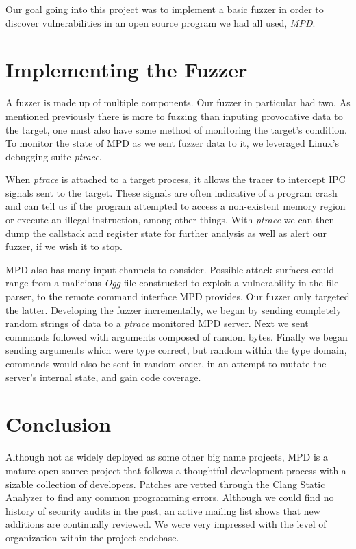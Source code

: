 \documentclass[10pt]{article}
\begin{document}
Our goal going into this project was to implement a basic fuzzer in order to discover vulnerabilities in an open source program we had all used, \emph{MPD}.
\section{Implementing the Fuzzer}
A fuzzer is made up of multiple components. Our fuzzer in particular had two. As mentioned previously there is more to fuzzing than inputing provocative data to the target, one must also have some method of monitoring the target's condition. To monitor the state of MPD as we sent fuzzer data to it, we leveraged Linux's debugging suite \emph{ptrace}. 

When \emph{ptrace} is attached to a target process, it allows the tracer to intercept IPC signals sent to the target. These signals are often indicative of a program crash and can tell us if the program attempted to access a non-existent memory region or execute an illegal instruction, among other things. With \emph{ptrace} we can then dump the callstack and register state for further analysis as well as alert our fuzzer, if we wish it to stop.

MPD also has many input channels to consider. Possible attack surfaces could range from a malicious \emph{Ogg} file constructed to exploit a vulnerability in the file parser, to the remote command interface MPD provides. Our fuzzer only targeted the latter. Developing the fuzzer incrementally, we began by sending completely random strings of data to a \emph{ptrace} monitored MPD server. Next we sent commands followed with arguments composed of random bytes. Finally we began sending arguments which were type correct, but random within the type domain, commands would also be sent in random order, in an attempt to mutate the server's internal state, and gain code coverage.

\section{Conclusion}
Although not as widely deployed as some other big name projects, MPD is a mature open-source project that follows a thoughtful development process with a sizable collection of developers. Patches are vetted through the Clang Static Analyzer to find any common programming errors. Although we could find no history of security audits in the past, an active mailing list shows that new additions are continually reviewed. We were very impressed with the level of organization within the project codebase.
\end{document}
